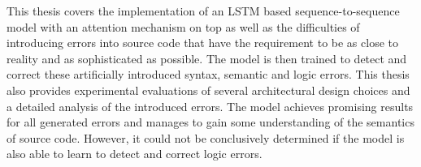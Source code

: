 \noindent This thesis covers the implementation of an LSTM based sequence-to-sequence model with an attention mechanism on top as well as the difficulties of introducing errors into source code that have the requirement to be as close to reality and as sophisticated as possible. The model is then trained to detect and correct these artificially introduced syntax, semantic and logic errors. This thesis also provides experimental evaluations of several architectural design choices and a detailed analysis of the introduced errors. The model achieves promising results for all generated errors and manages to gain some understanding of the semantics of source code. However, it could not be conclusively determined if the model is also able to learn to detect and correct logic errors. 
